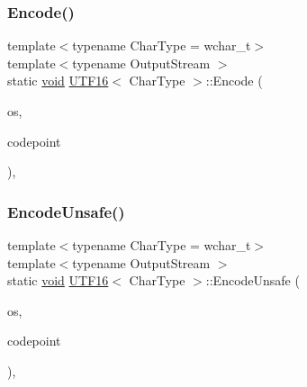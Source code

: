 \subsubsection{\texorpdfstring{Encode()}{Encode()}}
{\footnotesize\ttfamily template$<$typename Char\+Type  = wchar\+\_\+t$>$ \\
template$<$typename Output\+Stream $>$ \\
static \hyperlink{imgui__impl__opengl3__loader_8h_ac668e7cffd9e2e9cfee428b9b2f34fa7}{void} \hyperlink{structUTF16}{U\+T\+F16}$<$ Char\+Type $>$\+::Encode (\begin{DoxyParamCaption}\item[{Output\+Stream \&}]{os,  }\item[{unsigned}]{codepoint }\end{DoxyParamCaption})\hspace{0.3cm}{\ttfamily [inline]}, {\ttfamily [static]}}

\mbox{\label{structUTF16_aa67661e756c273871b574e7133b7fc63}} 
\subsubsection{\texorpdfstring{Encode\+Unsafe()}{EncodeUnsafe()}}
{\footnotesize\ttfamily template$<$typename Char\+Type  = wchar\+\_\+t$>$ \\
template$<$typename Output\+Stream $>$ \\
static \hyperlink{imgui__impl__opengl3__loader_8h_ac668e7cffd9e2e9cfee428b9b2f34fa7}{void} \hyperlink{structUTF16}{U\+T\+F16}$<$ Char\+Type $>$\+::Encode\+Unsafe (\begin{DoxyParamCaption}\item[{Output\+Stream \&}]{os,  }\item[{unsigned}]{codepoint }\end{DoxyParamCaption})\hspace{0.3cm}{\ttfamily [inline]}, {\ttfamily [static]}}

\mbox{\label{structUTF16_a04aeeefa5dcba7c5156bc78a5c1f1557}} 
